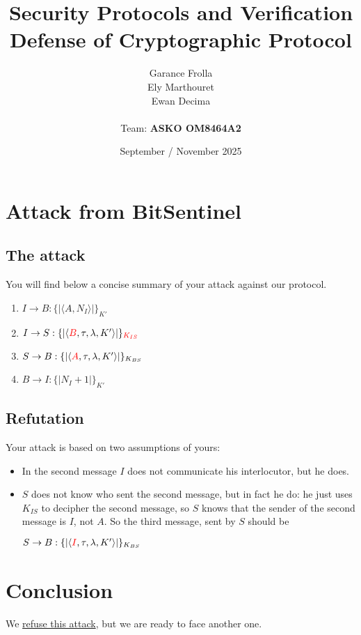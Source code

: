 \documentclass[11pt]{article}
\begin{document}
    \title{
            { \textbf{Security Protocols and Verification}} \\[1ex]
        {\small Defense of Cryptographic Protocol}
    }


    \author{
        Garance Frolla \\
        Ely Marthouret \\
        Ewan Decima\\ \\
        Team: \textbf{ASKO OM8464A2}
    }

    \date{September / November 2025}


    \maketitle
    \tableofcontents
    \newpage

    \section{Attack from BitSentinel}

    \subsection{The attack}
    You will find below a concise summary of your attack against our protocol.

    \begin{enumerate}
        \item $I \rightarrow B: \{|\langle A, N_I \rangle |\}_{K'}$
        \item $I \rightarrow S: \{|\langle \textcolor{red}{B}, \tau, \lambda, K' \rangle |\}_{\textcolor{red}{K_{IS}}}$
        \item $S \rightarrow B: \{|\langle \textcolor{red}{A}, \tau, \lambda, K' \rangle|\}_{K_{BS}}$
        \item $B \rightarrow I: \{| N_I +1 |\}_{K'}$
    \end{enumerate}
    \subsection{Refutation}

    Your attack is based on two assumptions of yours:
    \begin{itemize}
        \item In the second message $I$ does not communicate his interlocutor, but he does.
        \item $S$ does not know who sent the second message, but in fact he do: he just uses $K_{IS}$ to decipher the
            second message, so $S$ knows that the sender of the second message is $I$, not $A$. So the third message, sent by $S$ should be
            \begin{center} $S \rightarrow B: \{|\langle \textcolor{red}{I}, \tau, \lambda, K' \rangle|\}_{K_{BS}}$ \end{center}

    \end{itemize}










    \section{Conclusion}
    We \underline{refuse this attack}, but we are ready to face another one.
\end{document}
